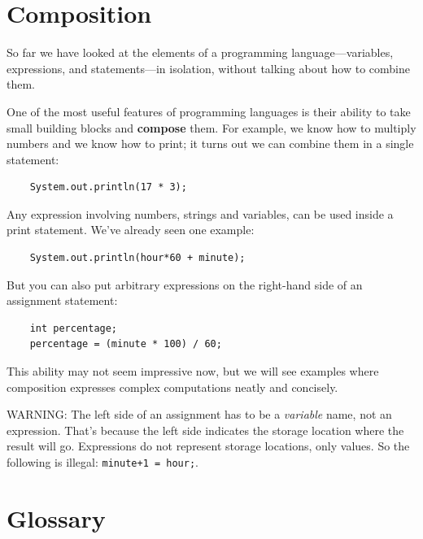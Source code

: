 \documentclass[12pt]{book}
\theoremstyle{exercise}
\begin{document}
\section{Composition}

So far we have looked at the elements of a programming
language---variables, expressions, and statements---in
isolation, without talking about how to combine them.

One of the most useful features of programming languages
is their ability to take small building blocks and
{\bf compose} them.  For example, we know how to multiply
numbers and we know how to print; it turns out we can
combine them in a single statement:

\begin{lstlisting}
    System.out.println(17 * 3);
\end{lstlisting}
%
Any expression involving numbers, strings
and variables, can be used inside a print statement.  We've
already seen one example:

\begin{lstlisting}
    System.out.println(hour*60 + minute);
\end{lstlisting}
%
But you can also put arbitrary expressions on the right-hand
side of an assignment statement:

\begin{lstlisting}
    int percentage;
    percentage = (minute * 100) / 60;
\end{lstlisting}
%
This ability may not seem impressive now, but we will see
examples where composition
expresses complex computations neatly and concisely.

WARNING: The left side of an assignment
has to be a {\em variable} name, not an expression.
That's because the left side indicates the storage location
where the result will go.  Expressions
do not represent storage locations, only values.  So the
following is illegal:  {\tt minute+1 = hour;}.

\section{Glossary}
\end{document}

